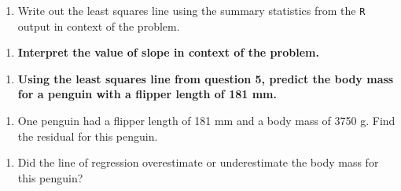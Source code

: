 \documentclass[
]{report}
\newenvironment{Shaded}{\begin{snugshade}}{\end{snugshade}}
\newcommand{\AttributeTok}[1]{\textcolor[rgb]{0.77,0.63,0.00}{#1}}
\newcommand{\CommentTok}[1]{\textcolor[rgb]{0.56,0.35,0.01}{\textit{#1}}}
\newcommand{\FunctionTok}[1]{\textcolor[rgb]{0.00,0.00,0.00}{#1}}
\newcommand{\NormalTok}[1]{#1}
\newcommand{\OtherTok}[1]{\textcolor[rgb]{0.56,0.35,0.01}{#1}}
\newcommand{\SpecialCharTok}[1]{\textcolor[rgb]{0.00,0.00,0.00}{#1}}
\providecommand{\tightlist}{%
  \setlength{\itemsep}{0pt}\setlength{\parskip}{0pt}}
\begin{document}
\begin{Shaded}
\end{Shaded}

\begin{enumerate}
\def\labelenumi{\arabic{enumi}.}
\setcounter{enumi}{4}
\tightlist
\item
  Write out the least squares line using the summary statistics from the \texttt{R} output in context of the problem.
\end{enumerate}

\vspace{.5in}

\begin{enumerate}
\def\labelenumi{\arabic{enumi}.}
\setcounter{enumi}{5}
\tightlist
\item
  \textbf{Interpret the value of slope in context of the problem.}
\end{enumerate}

\vspace{.8in}

\begin{enumerate}
\def\labelenumi{\arabic{enumi}.}
\setcounter{enumi}{6}
\tightlist
\item
  \textbf{Using the least squares line from question 5, predict the body mass for a penguin with a flipper length of 181 mm.}
\end{enumerate}

\vspace{.6in}

\begin{enumerate}
\def\labelenumi{\arabic{enumi}.}
\setcounter{enumi}{7}
\tightlist
\item
  One penguin had a flipper length of 181 mm and a body mass of 3750 g. Find the residual for this penguin.
\end{enumerate}

\vspace{.8in}

\begin{enumerate}
\def\labelenumi{\arabic{enumi}.}
\setcounter{enumi}{8}
\tightlist
\item
  Did the line of regression overestimate or underestimate the body mass for this penguin?
\end{enumerate}
\end{document}
